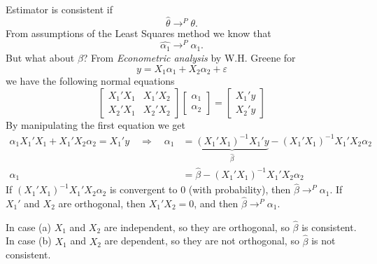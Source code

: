 \documentclass[12pt, a4paper]{article}\usepackage[]{graphicx}\usepackage[]{color}
\begin{document}
Estimator is consistent if
\[ \hat{\theta} \rightarrow^P \theta. \]
From assumptions of the Least Squares method we know that  
\[ \hat{\alpha_1} \rightarrow^P \alpha_1. \]
But what about $\beta$?
From \textit{Econometric analysis} by W.H. Greene for 
\[ y = X_1\alpha_1+X_2\alpha_2 + \varepsilon \]
we have the following normal equations 
\[ \begin{bmatrix}  
      X_1' X_1 & X_1' X_2 \\ 
      X_2' X_1 & X_2' X_2
  \end{bmatrix} 
  \begin{bmatrix}  
      \alpha_1 \\ 
      \alpha_2  
  \end{bmatrix}
  =
  \begin{bmatrix}  
      X_1' y \\ 
      X_2' y  
  \end{bmatrix}
\]
By manipulating the first equation we get
\begin{align*}
\alpha_1 X_1' X_1 + X_1' X_2 \alpha_2 = X_1' y \quad\Rightarrow\quad
\alpha_1 & = \underbrace{(X_1' X_1)^{-1} X_1' y}_{\hat{\beta}} - (X_1'X_1)^{-1} X_1'X_2\alpha_2 \\
\alpha_1 & = \hat{\beta} - (X_1'X_1)^{-1} X_1'X_2\alpha_2 
\end{align*}
If $(X_1'X_1)^{-1} X_1'X_2\alpha_2$ is convergent to 0 (with probability), then $\hat{\beta} \rightarrow^P \alpha_1$.
If $X_1'$ and $X_2$ are orthogonal, then $X_1'X_2=0$, and then $\hat{\beta} \rightarrow^P \alpha_1$.

In case (a) $X_1$ and $X_2$ are independent, so they are orthogonal, so $\hat{\beta}$ is consistent.
In case (b) $X_1$ and $X_2$ are dependent, so they are not orthogonal, so $\hat{\beta}$ is not consistent.




\end{document}
